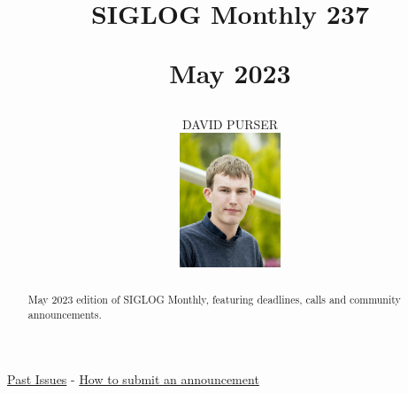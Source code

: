 \documentclass[prodmode,acmtecs]{acmsmall} %
\newcounter{colstart}
\begin{document}
\setcounter{colstart}{\thepage}

\title{{\huge\sc SIGLOG Monthly 237}

 May 2023}
\author{DAVID PURSER
\vspace*{-2.6cm}\begin{flushright}\includegraphics[width=30mm]{dp}\end{flushright}
}

\begin{abstract}
May 2023 edition of SIGLOG Monthly, featuring deadlines, calls and community announcements.
\end{abstract}


\maketitlee

\href{https://lics.siglog.org/newsletters/}{Past Issues}
 - 
\href{https://lics.siglog.org/newsletters/inst.html}{How to submit an announcement}
\end{document}
